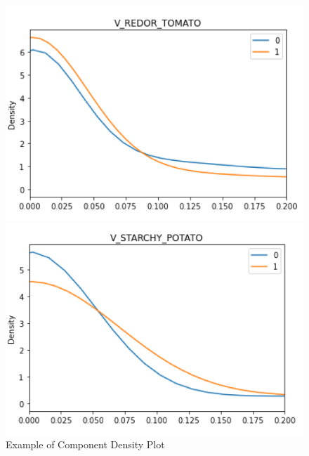 \documentclass{article}
\begin{document}
\begin{figure}[htb]
\begin{minipage}[b]{.48\linewidth}
  \centering
  \centerline{\includegraphics[scale=0.175]{V_REDOR_TOMATO_kde.png}}
\end{minipage}
\hfill
\begin{minipage}[b]{0.48\linewidth}
  \centering
  \centerline{\includegraphics[scale=0.175]{V_STARCHY_POTATO_kde.png}}
\end{minipage}
\caption{Example of Component Density Plot}
\label{fig:res}
\end{figure}
\end{document}
